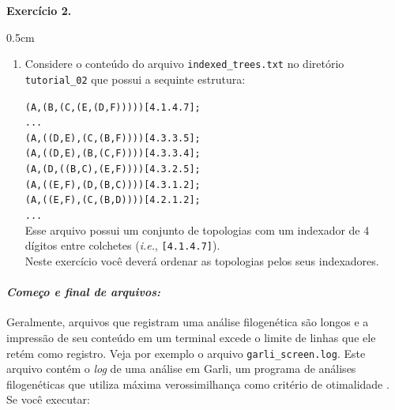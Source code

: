 \begin{refsection}
\begin{blackBlock}{\textbf{Exercício 2.}}
\begin {myindentpar}{0.5cm}
\begin{enumerate}[\itshape i.]

 \item{Considere o conteúdo do arquivo \texttt{indexed\_trees.txt} no diretório \texttt{tutorial\_02} que possui a sequinte estrutura:}

\texttt{(A,(B,(C,(E,(D,F)))))[4.1.4.7];}\\
\texttt{...}\\
\texttt{(A,((D,E),(C,(B,F))))[4.3.3.5];}\\
\texttt{(A,((D,E),(B,(C,F))))[4.3.3.4];}\\
\texttt{(A,(D,((B,C),(E,F))))[4.3.2.5];}\\
\texttt{(A,((E,F),(D,(B,C))))[4.3.1.2];}\\
\texttt{(A,((E,F),(C,(B,D))))[4.2.1.2];}\\
\texttt{...}\\

Esse arquivo possui um conjunto de topologias com um indexador de 4 dígitos entre colchetes (\textit{i.e.}, \texttt{[4.1.4.7]}).\\
Neste exercício você deverá ordenar as topologias pelos seus indexadores.

\end{enumerate}
\end{myindentpar}

\end{blackBlock}


\paragraph{\textit{Começo e final de arquivos:}}\label{tut2:text:editors:texttools:headtail}
Geralmente, arquivos que registram uma análise filogenética são longos e a impressão de seu conteúdo em um terminal excede o limite de linhas que ele retém como registro. Veja por exemplo o arquivo \texttt{garli\_screen.log}. Este arquivo contém o \textit{log} de uma análise em Garli, um programa de análises filogenéticas que utiliza máxima verossimilhança como critério de otimalidade \parencite{Zwickl_2006}.\\

Se você executar:\\
\\


\end{refsection}
